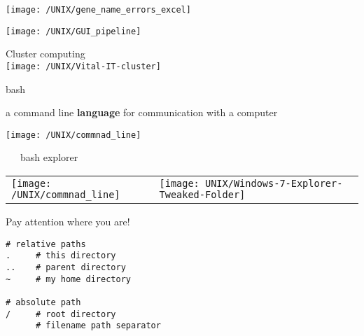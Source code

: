 \documentclass[xcolor=dvipsnames]{beamer}
\begin{document}
\begin{frame}
	\begin{center}
		\texttt{[image: /UNIX/gene\_name\_errors\_excel]}
	\end{center}
\end{frame}


\begin{frame}
	\begin{center}
		\texttt{[image: /UNIX/GUI\_pipeline]}
	\end{center}
\end{frame}


\begin{frame}
	\begin{center}
		\Huge
		Cluster computing\\
		\vspace{1cm}
		\texttt{[image: /UNIX/Vital-IT-cluster]}
	\end{center}
\end{frame}

\begin{frame}
	\Huge
	\begin{center}
		bash
	\end{center}
	\large
	a command line \textbf{language} for communication with a computer
\end{frame}

\begin{frame}
	\begin{center}
		\texttt{[image: /UNIX/commnad\_line]}
	\end{center}
\end{frame}


\begin{frame}
	~~~bash \hfill explorer~~~
	\begin{center}
	\begin{tabular}{L{0.5\textwidth}L{0.5\textwidth}}
		\texttt{[image: /UNIX/commnad\_line]} &
		\texttt{[image: UNIX/Windows-7-Explorer-Tweaked-Folder]} \\
	\end{tabular}
	\end{center}
\end{frame}

\begin{frame}[fragile]
Pay attention where you are!
\begin{verbatim}
# relative paths
.     # this directory
..    # parent directory
~     # my home directory

# absolute path
/     # root directory
      # filename path separator

\end{verbatim}
\end{frame}
\end{document}
